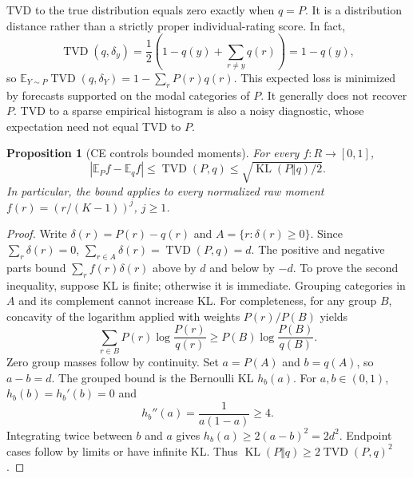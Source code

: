 \documentclass[11pt,letterpaper]{article}
\newtheorem{proposition}{Proposition}
\newcommand{\KL}{\operatorname{KL}}
\newcommand{\TV}{\operatorname{TVD}}
\newcommand{\E}{\mathbb{E}}
\begin{document}
TVD to the true distribution equals zero exactly when $q=P$.
It is a distribution distance rather than a strictly proper individual-rating score.
In fact,
\[
 \TV(q,\delta_y)=\frac12\left(1-q(y)+\sum_{r\ne y}q(r)\right)=1-q(y),
\]
so $\E_{Y\sim P}\TV(q,\delta_Y)=1-\sum_rP(r)q(r)$.
This expected loss is minimized by forecasts supported on the modal categories of $P$.
It generally does not recover $P$.
TVD to a sparse empirical histogram is also a noisy diagnostic, whose expectation need not equal TVD to $P$.

\begin{proposition}[CE controls bounded moments]\label{prop:pinsker}
For every $f:R\to[0,1]$,
\begin{equation}\label{eq:momentbound}
 |\E_P f-\E_q f|\le\TV(P,q)\le\sqrt{\KL(P\Vert q)/2}.
\end{equation}
In particular, the bound applies to every normalized raw moment $f(r)=(r/(K-1))^j$, $j\ge1$.
\end{proposition}
\begin{proof}
Write $\delta(r)=P(r)-q(r)$ and $A=\{r:\delta(r)\ge0\}$.
Since $\sum_r\delta(r)=0$, $\sum_{r\in A}\delta(r)=\TV(P,q)=d$.
The positive and negative parts bound $\sum_r f(r)\delta(r)$ above by $d$ and below by $-d$.
To prove the second inequality, suppose KL is finite; otherwise it is immediate.
Grouping categories in $A$ and its complement cannot increase KL.
For completeness, for any group $B$, concavity of the logarithm applied with weights $P(r)/P(B)$ yields
\[
 \sum_{r\in B}P(r)\log\frac{P(r)}{q(r)}\ge P(B)\log\frac{P(B)}{q(B)}.
\]
Zero group masses follow by continuity.
Set $a=P(A)$ and $b=q(A)$, so $a-b=d$.
The grouped bound is the Bernoulli KL $h_b(a)$.
For $a,b\in(0,1)$, $h_b(b)=h_b'(b)=0$ and
\[
 h_b''(a)=\frac1{a(1-a)}\ge4.
\]
Integrating twice between $b$ and $a$ gives $h_b(a)\ge2(a-b)^2=2d^2$.
Endpoint cases follow by limits or have infinite KL.
Thus $\KL(P\Vert q)\ge2\TV(P,q)^2$.
\end{proof}
\end{document}
